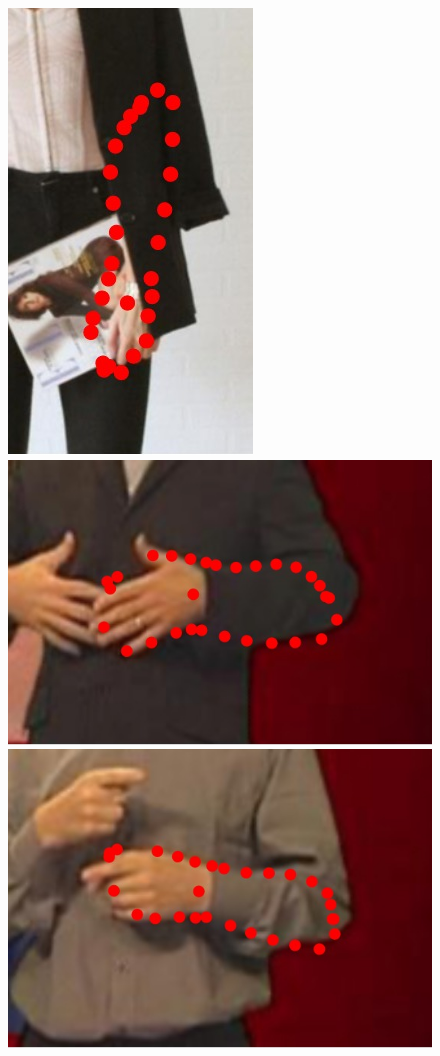 \begin{figure}
    \hfill
    \includegraphics[height=\ofh]{resources/Annotation_Correction/Suplementory_Meterial/ExFit/0023}
    \hfill
    \includegraphics[height=\ofh]{resources/Annotation_Correction/Suplementory_Meterial/ExFit/0024}
    \hfill
    \includegraphics[height=\ofh]{resources/Annotation_Correction/Suplementory_Meterial/ExFit/0025}

\end{figure}
